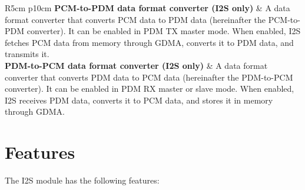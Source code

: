 \documentclass[main\_\_EN.tex]{subfiles}
\begin{document}
\begin{longtable}[c]{ R{5cm} p{10cm} }
\textbf{PCM-to-PDM data format converter (I2S only)} & A data format converter that converts PCM data to PDM data (hereinafter the PCM-to-PDM converter). It can be enabled in PDM TX master mode. When enabled, I2S fetches PCM data from memory through GDMA, converts it to PDM data, and transmits it.\\
\textbf{PDM-to-PCM data format converter (I2S only)} & A data format converter that converts PDM data to PCM data (hereinafter the PDM-to-PCM converter). It can be enabled in PDM RX master or slave mode. When enabled, I2S receives PDM data, converts it to PCM data, and stores it in memory through GDMA.\\
\end{longtable}

\section{Features}
\label{sec:i2s-features}

The I2S module has the following features:
\end{document}
